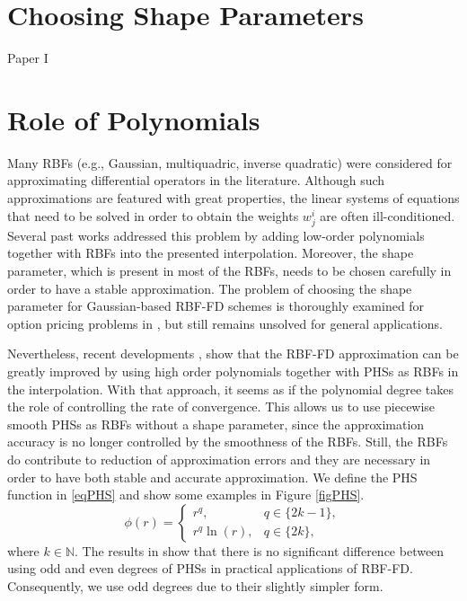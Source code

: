 \documentclass{UUThesisTemplate}
\begin{document}
\section{Choosing Shape Parameters}
Paper I
%
\section{Role of Polynomials}
Many RBFs (e.g., Gaussian, multiquadric, inverse quadratic) were considered for approximating differential operators in the literature. Although such approximations are featured with great properties, the linear systems of equations that need to be solved in order to obtain the weights $w_j^i$ are often ill-conditioned. Several past works \cite{davydov2011adaptive, fornberg2011stabilization, flyer2012guide, larsson2013stable, fornberg2013stable, flyer2016enhancing} addressed this problem by adding low-order polynomials together with RBFs into the presented interpolation. Moreover, the shape parameter, which is present in most of the RBFs, needs to be chosen carefully in order to have a stable approximation. The problem of choosing the shape parameter for Gaussian-based RBF-FD schemes is thoroughly examined for option pricing problems in \cite{milovanovic2018radial}, but still remains unsolved for general applications.
\par
Nevertheless, recent developments \cite{bayona2017role, flyer2016on}, show that the RBF-FD approximation can be greatly improved by using high order polynomials together with PHSs as RBFs in the interpolation. With that approach, it seems as if the polynomial degree takes the role of controlling the rate of convergence. This allows us to use piecewise smooth PHSs as RBFs without a shape parameter, since the approximation accuracy is no longer controlled by the smoothness of the RBFs. Still, the RBFs do contribute to reduction of approximation errors and they are necessary in order to have both stable and accurate approximation. We define the PHS function in \eqref{eqPHS} and show some examples in Figure \ref{figPHS}.%
\begin{equation}
\label{eqPHS}
\phi(r) =  
	\begin{cases}
		r^q, & q\in\{2k-1\}, \\
		r^q \ln(r), & q\in\{2k\},
	\end{cases}
\end{equation}
where $k \in \mathbb{N}$. The results in \cite{flyer2016on} show that there is no significant difference between using odd and even degrees of PHSs in practical applications of RBF-FD. Consequently, we use odd degrees due to their slightly simpler form.%
\end{document}
